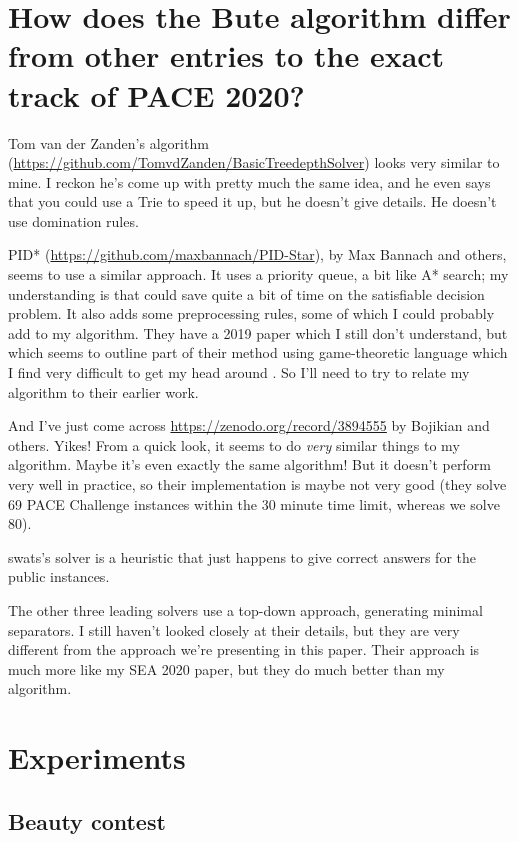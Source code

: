 \section{How does the Bute algorithm differ from other entries to the exact track of PACE 2020?}\label{sec:paceentries}

Tom van der Zanden's algorithm (\url{https://github.com/TomvdZanden/BasicTreedepthSolver})
looks very similar to mine.  I reckon he's come up with pretty much the same idea, and he
even says that you could use a Trie to speed it up, but he doesn't give details.  He doesn't
use domination rules.

PID* (\url{https://github.com/maxbannach/PID-Star}), by Max Bannach and others,
seems to use a similar approach.  It uses a priority queue, a bit like A* search; my understanding
is that could save quite a bit of time on the satisfiable decision problem.  It also adds some
preprocessing rules, some of which I could probably add to my algorithm.
They have a 2019 paper which I still don't understand, but which seems to outline
part of their method using game-theoretic language which I find very difficult to get
my head around \cite{DBLP:conf/wads/BannachB19}.  So I'll need to try to relate my
algorithm to their earlier work.

And I've just come across \url{https://zenodo.org/record/3894555} by Bojikian and others.
Yikes!  From a quick look, it seems to do \emph{very} similar things to my algorithm.
Maybe it's even exactly the same algorithm!  But it doesn't perform very well in practice,
so their implementation is maybe not very good (they solve 69 PACE Challenge instances
within the 30 minute time limit, whereas we solve 80).

swats's solver is a heuristic that just happens to give correct answers for the public
instances.

The other three leading solvers use a top-down approach, generating minimal separators.
I still haven't looked closely at their details, but they are very different from the approach
we're presenting in this paper.  Their approach is much more like my SEA 2020 paper, but they
do much better than my algorithm.

\section{Experiments}\label{sec:experiments}

\subsection{Beauty contest}

